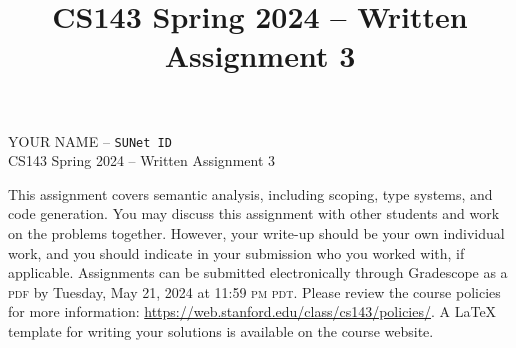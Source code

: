 \documentclass[11pt]{article}
\title{CS143 Spring 2024 -- Written Assignment 3}
\newcommand\duedate{Tuesday, May 21, 2024 at 11:59 \textsc{pm pdt}}
\begin{document}
\begin{center}
\LARGE YOUR NAME -- \texttt{SUNet ID} \\
\LARGE CS143 Spring 2024 -- Written Assignment 3
\end{center}

This assignment covers semantic analysis, including scoping, type systems,
and code generation. You may discuss this assignment with other students and
work on the problems together. However, your write-up should be your own
individual work, and you should indicate in your submission who you worked
with, if applicable. Assignments can be submitted electronically through
Gradescope as a \textsc{pdf} by \duedate. Please review the course policies
for more information: \url{https://web.stanford.edu/class/cs143/policies/}.
A \LaTeX{} template for writing your solutions is available on the course
website.
\end{document}
